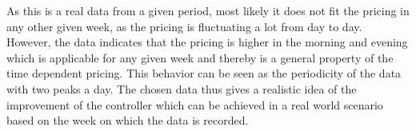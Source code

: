As this is a real data from a given period, most likely it does not fit the pricing in any other given week, as the pricing is fluctuating a lot from day to day. However, the data indicates that the pricing is higher in the morning and evening which is applicable for any given week and thereby is a general property of the time dependent pricing. This behavior can be seen as the periodicity of the data with two peaks a day. The chosen data thus gives a realistic idea of the improvement of the controller which can be achieved in a real world scenario based on the week on which the data is recorded.  


